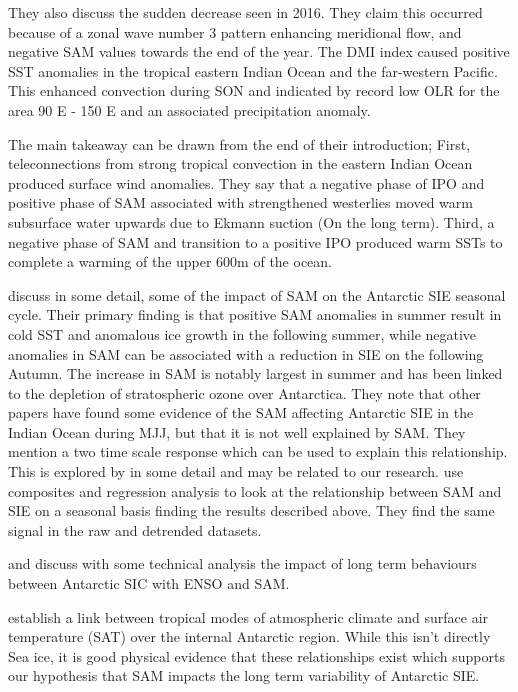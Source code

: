 \documentclass[../main.tex]{subfiles}
\begin{document}
They also discuss the sudden decrease seen in 2016. They claim this occurred because of a zonal wave number 3 pattern enhancing meridional flow, and negative SAM values towards the end of the year. The DMI index caused positive SST anomalies in the tropical eastern Indian Ocean and the far-western Pacific. This enhanced convection during SON and indicated by record low OLR for the area 90 E - 150 E and an associated precipitation anomaly.

The main takeaway can be drawn from the end of their introduction; First, teleconnections from strong tropical convection in the eastern Indian Ocean produced surface wind anomalies.
They say that a negative phase of IPO and positive phase of SAM associated with strengthened westerlies moved warm subsurface water upwards due to Ekmann suction (On the long term). Third, a negative phase of SAM and transition to a positive IPO produced warm SSTs to complete a warming of the upper 600m of the ocean.
\medskip

\cite{Doddridge2017ModulationMode} discuss in some detail, some of the impact of SAM on the Antarctic SIE seasonal cycle. Their primary finding is that positive SAM anomalies in summer result in cold SST and anomalous ice growth in the following summer, while negative anomalies in SAM can be associated with a reduction in SIE on the following Autumn. The increase in SAM is notably largest in summer and has been linked to the depletion of stratospheric ozone over Antarctica. They note that other papers have found some evidence of the SAM affecting Antarctic SIE in the Indian Ocean during MJJ, but that it is not well explained by SAM. They mention a two time scale response which can be used to explain this relationship. This is explored by \cite{FerreiraAntarcticProblem} in some detail and may be related to our research. \cite{Doddridge2017ModulationMode} use composites and regression analysis to look at the relationship between SAM and SIE on a seasonal basis finding the results described above. They find the same signal in the raw and detrended datasets.


\cite{Simpkins2012SeasonalConcentration} and \cite{Kohyama2016AntarcticVariability} discuss with some technical analysis the impact of long term behaviours between Antarctic SIC with ENSO and SAM.



\cite{Clem2020RecordDecades} establish a link between tropical modes of atmospheric climate and surface air temperature (SAT) over the internal Antarctic region. While this isn't directly Sea ice, it is good physical evidence that these relationships exist which supports our hypothesis that SAM impacts the long term variability of Antarctic SIE.
\end{document}
